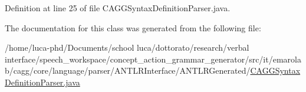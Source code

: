 Definition at line 25 of file C\-A\-G\-G\-Syntax\-Definition\-Parser.\-java.



The documentation for this class was generated from the following file\-:\begin{DoxyCompactItemize}
\item 
/home/luca-\/phd/\-Documents/school luca/dottorato/research/verbal interface/speech\-\_\-workspace/concept\-\_\-action\-\_\-grammar\-\_\-generator/src/it/emarolab/cagg/core/language/parser/\-A\-N\-T\-L\-R\-Interface/\-A\-N\-T\-L\-R\-Generated/\hyperlink{CAGGSyntaxDefinitionParser_8java}{C\-A\-G\-G\-Syntax\-Definition\-Parser.\-java}\end{DoxyCompactItemize}
